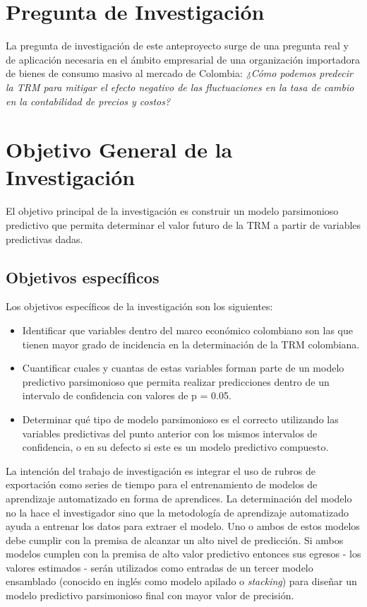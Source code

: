 \section{Pregunta de Investigación}
La pregunta de investigación de este anteproyecto surge de una pregunta real y de aplicación necesaria en el ámbito empresarial de una organización importadora de bienes de consumo masivo al mercado de Colombia: \emph{¿Cómo podemos predecir la TRM para mitigar el efecto negativo de las fluctuaciones en la tasa de cambio en la contabilidad de precios y costos?}

\section{Objetivo General de la Investigación}
El objetivo principal de la investigación es construir un modelo parsimonioso predictivo que permita determinar el valor futuro de la TRM a partir de variables predictivas dadas.

\subsection{Objetivos específicos}
Los objetivos específicos de la investigación son los siguientes:

\begin{itemize}
	\item Identificar que variables dentro del marco económico colombiano son las que tienen mayor grado de incidencia en la determinación de la TRM colombiana. 
	\item Cuantificar cuales y cuantas de estas variables forman parte de un modelo predictivo parsimonioso que permita realizar predicciones dentro de un intervalo de confidencia con valores de p = 0.05. 
	\item Determinar qué tipo de modelo parsimonioso es el correcto utilizando las variables predictivas del punto anterior con los mismos intervalos de confidencia, o en su defecto si este es un modelo predictivo compuesto. 
\end{itemize}

La intención del trabajo de investigación es integrar el uso de rubros de exportación como series de tiempo para el entrenamiento de modelos de aprendizaje automatizado en forma de aprendices. La determinación del modelo no la hace el investigador sino que la metodología de aprendizaje automatizado ayuda a entrenar los datos para extraer el modelo. Uno o ambos de estos modelos debe cumplir con la premisa de alcanzar un alto nivel de predicción. Si ambos modelos cumplen con la premisa de alto valor predictivo entonces sus egresos - los valores estimados - serán utilizados como entradas de un tercer modelo ensamblado (conocido en inglés como modelo apilado o \textit{stacking}) para diseñar un modelo predictivo parsimonioso final con mayor valor de precisión.   

